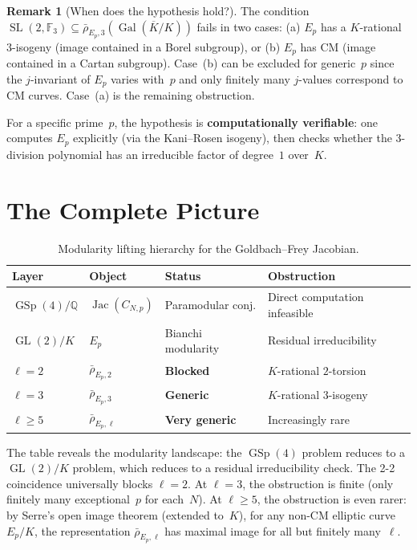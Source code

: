 \documentclass[11pt,a4paper]{article}
\theoremstyle{definition}
\newtheorem{remark}[theorem]{Remark}
\DeclareMathOperator{\Gal}{Gal}
\DeclareMathOperator{\GL}{GL}
\DeclareMathOperator{\SL}{SL}
\DeclareMathOperator{\GSp}{GSp}
\DeclareMathOperator{\Jac}{Jac}
\begin{document}
\begin{remark}[When does the hypothesis hold?]\label{rem:hypothesis}
The condition $\SL(2, \mathbb{F}_3) \subseteq \bar{\rho}_{E_p,3}(\Gal(\overline{K}/K))$ fails in two cases: (a) $E_p$ has a $K$-rational $3$-isogeny (image contained in a Borel subgroup), or (b) $E_p$ has CM (image contained in a Cartan subgroup). Case~(b) can be excluded for generic~$p$ since the $j$-invariant of $E_p$ varies with~$p$ and only finitely many $j$-values correspond to CM curves. Case~(a) is the remaining obstruction.

For a specific prime~$p$, the hypothesis is \textbf{computationally verifiable}: one computes $E_p$ explicitly (via the Kani--Rosen isogeny), then checks whether the $3$-division polynomial has an irreducible factor of degree~$1$ over~$K$.
\end{remark}

\section{The Complete Picture}\label{sec:picture}

\begin{table}[ht]
\centering
\renewcommand{\arraystretch}{1.3}
\begin{tabular}{>{\raggedright}p{3cm} p{3.2cm} p{3.2cm} p{3.5cm}}
\toprule
\textbf{Layer} & \textbf{Object} & \textbf{Status} & \textbf{Obstruction} \\
\midrule
$\GSp(4)/\mathbb{Q}$ & $\Jac(C_{N,p})$ & Paramodular conj. & Direct computation infeasible \\
$\GL(2)/K$ & $E_p$ & Bianchi modularity & Residual irreducibility \\
$\ell = 2$ & $\bar{\rho}_{E_p,2}$ & \textbf{Blocked} & $K$-rational $2$-torsion \\
$\ell = 3$ & $\bar{\rho}_{E_p,3}$ & \textbf{Generic} & $K$-rational $3$-isogeny \\
$\ell \ge 5$ & $\bar{\rho}_{E_p,\ell}$ & \textbf{Very generic} & Increasingly rare \\
\bottomrule
\end{tabular}
\caption{Modularity lifting hierarchy for the Goldbach--Frey Jacobian.}
\label{tab:hierarchy}
\end{table}

The table reveals the modularity landscape: the $\GSp(4)$ problem reduces to a $\GL(2)/K$ problem, which reduces to a residual irreducibility check. The 2-2 coincidence universally blocks $\ell = 2$. At $\ell = 3$, the obstruction is finite (only finitely many exceptional~$p$ for each~$N$). At $\ell \ge 5$, the obstruction is even rarer: by Serre's open image theorem (extended to~$K$), for any non-CM elliptic curve $E_p/K$, the representation $\bar{\rho}_{E_p,\ell}$ has maximal image for all but finitely many~$\ell$.
\end{document}
